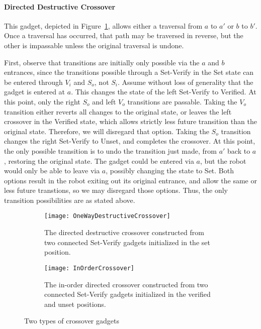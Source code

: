 \paragraph{Directed Destructive Crossover} This gadget, depicted in Figure~\ref{fig:DestructiveCrossover}, allows either a traversal from $a$ to $a'$ or $b$ to $b'$. Once a traversal has occurred, that path may be traversed in reverse, but the other is impassable unless the original traversal is undone.

First, observe that transitions are initially only possible via the $a$ and $b$ entrances, since the transitions possible through a Set-Verify in the Set state can be entered through $V_i$ and $S_o$, not $S_i$. Assume without loss of generality that the gadget is entered at $a$. This changes the state of the left Set-Verify to Verified. At this point, only the right $S_o$ and left $V_o$ transitions are passable. Taking the $V_o$ transition either reverts all changes to the original state, or leaves the left crossover in the Verified state, which allows strictly less future transition than the original state. Therefore, we will disregard that option. Taking the $S_o$ transition changes the right Set-Verify to Unset, and completes the crossover. At this point, the only possible transition is to undo the transition just made, from $a'$ back to $a$, restoring the original state. The gadget could be entered via $a$, but the robot would only be able to leave via $a$, possibly changing the state to Set. Both options result in the robot exiting out its original entrance, and allow the same or less future transtions, so we may disregard those options. Thus, the only transition possibilities are as stated above.

\begin{figure}[!ht]
  \centering
  \begin{subfigure}[b]{0.47\textwidth}
    \texttt{[image: OneWayDestructiveCrossover]}
    \caption{The directed destructive crossover constructed from two connected Set-Verify gadgets initialized in the set position.}
    \label{fig:DestructiveCrossover}
  \end{subfigure}
  \hfill
  \begin{subfigure}[b]{0.47\textwidth}
    \texttt{[image: InOrderCrossover]}
    \caption{The in-order directed crossover constructed from two connected Set-Verify gadgets initialized in the verified and unset positions.}
    \label{fig:InOrderCrossover}
  \end{subfigure}
  \caption{Two types of crossover gadgets}
\end{figure}

